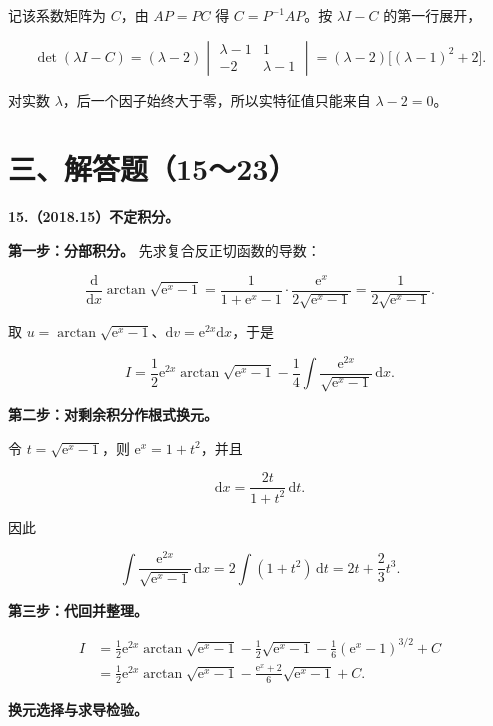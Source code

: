 \documentclass[UTF8,11pt,fontset=windows]{ctexart}
\begin{document}
记该系数矩阵为 $C$，由 $AP=PC$ 得 $C=P^{-1}AP$。按 $\lambda I-C$ 的第一行展开，

$$
\det(\lambda I-C)
=(\lambda-2)
\begin{vmatrix}\lambda-1&1\\-2&\lambda-1\end{vmatrix}
=(\lambda-2)\bigl[(\lambda-1)^2+2\bigr].
$$

对实数 $\lambda$，后一个因子始终大于零，所以实特征值只能来自 $\lambda-2=0$。

\clearpage

\section*{三、解答题（15～23）}

\textbf{15.（2018.15）不定积分。}

\textbf{第一步：分部积分。} 先求复合反正切函数的导数：

$$
\frac{\mathrm d}{\mathrm dx}\arctan\sqrt{\mathrm e^x-1}
=\frac1{1+\mathrm e^x-1}\cdot\frac{\mathrm e^x}{2\sqrt{\mathrm e^x-1}}
=\frac1{2\sqrt{\mathrm e^x-1}}.
$$

取 $u=\arctan\sqrt{\mathrm e^x-1}$、$\mathrm dv=\mathrm e^{2x}\mathrm dx$，于是

$$
I=\frac12\mathrm e^{2x}\arctan\sqrt{\mathrm e^x-1}
-\frac14\int\frac{\mathrm e^{2x}}{\sqrt{\mathrm e^x-1}}\,\mathrm dx.
$$

\textbf{第二步：对剩余积分作根式换元。}

令 $t=\sqrt{\mathrm e^x-1}$，则 $\mathrm e^x=1+t^2$，并且

$$
\mathrm dx=\frac{2t}{1+t^2}\,\mathrm dt.
$$

因此

$$
\int\frac{\mathrm e^{2x}}{\sqrt{\mathrm e^x-1}}\,\mathrm dx
=2\int(1+t^2)\,\mathrm dt=2t+\frac23t^3.
$$

\textbf{第三步：代回并整理。}

$$
\begin{aligned}
I&=\frac12\mathrm e^{2x}\arctan\sqrt{\mathrm e^x-1}
-\frac12\sqrt{\mathrm e^x-1}
-\frac16(\mathrm e^x-1)^{3/2}+C\\
&=\frac12\mathrm e^{2x}\arctan\sqrt{\mathrm e^x-1}
-\frac{\mathrm e^x+2}{6}\sqrt{\mathrm e^x-1}+C.
\end{aligned}
$$

\textbf{换元选择与求导检验。}
\end{document}
